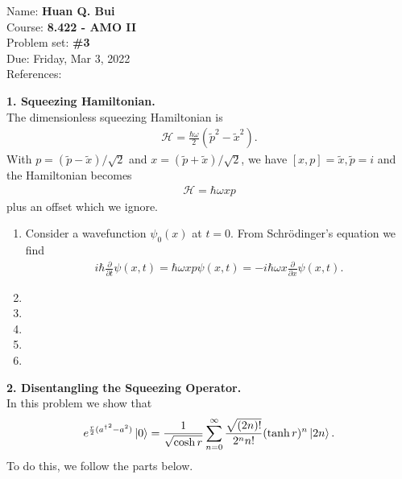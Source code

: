 \documentclass{article}
\theoremstyle{definition}
\newcommand{\p}{\partial}
\newcommand{\ham}{\mathcal{H}}
\newcommand{\f}[2]{\frac{#1}{#2}}
\begin{document}
\begin{framed}
\noindent Name: \textbf{Huan Q. Bui}\\
Course: \textbf{8.422 - AMO II}\\
Problem set: \textbf{\#3}\\
Due: Friday, Mar 3, 2022\\
References: 
\end{framed}
	
	
\noindent \textbf{1. Squeezing Hamiltonian.} \\

\noindent The dimensionless squeezing Hamiltonian is 
\begin{align*}
\ham = \f{\hbar \omega}{2} (\tilde{p}^2 - \tilde{x}^2). 
\end{align*}
With $p = (\tilde{p}- \tilde{x}) / \sqrt{2}$ and $x = (\tilde{p} + \tilde{x})/\sqrt{2}$, we have $[x,p] = \tilde{x}, \tilde{p} = i$ and the Hamiltonian becomes
\begin{align*}
\ham = \hbar \omega xp
\end{align*}
plus an offset which we ignore. 

\begin{enumerate}

\item Consider a wavefunction $\psi_0(x)$ at $t=0$. From Schr\"{o}dinger's equation we find 
\begin{align*}
i\hbar \f{\p}{\p t}\psi(x,t) = \hbar \omega x p \psi(x,t) = -i \hbar \omega x \f{\p}{\p x} \psi(x,t).
\end{align*}




\item 

\item 

\item 

\item 

\item 

\end{enumerate}



\noindent \textbf{2. Disentangling the Squeezing Operator.} \\

\noindent In this problem we show that
\begin{align*}
e^{\f{r}{2} ( {a^\dagger}^2 - a^2)}  \ket{0} = \f{1}{\sqrt{\cosh r}} \sum_{n=0}^\infty  \f{\sqrt{(2n)!}}{2^n n!} (\tanh r)^n \ket{2n}.
\end{align*}
To do this, we follow the parts below. 
\end{document}
